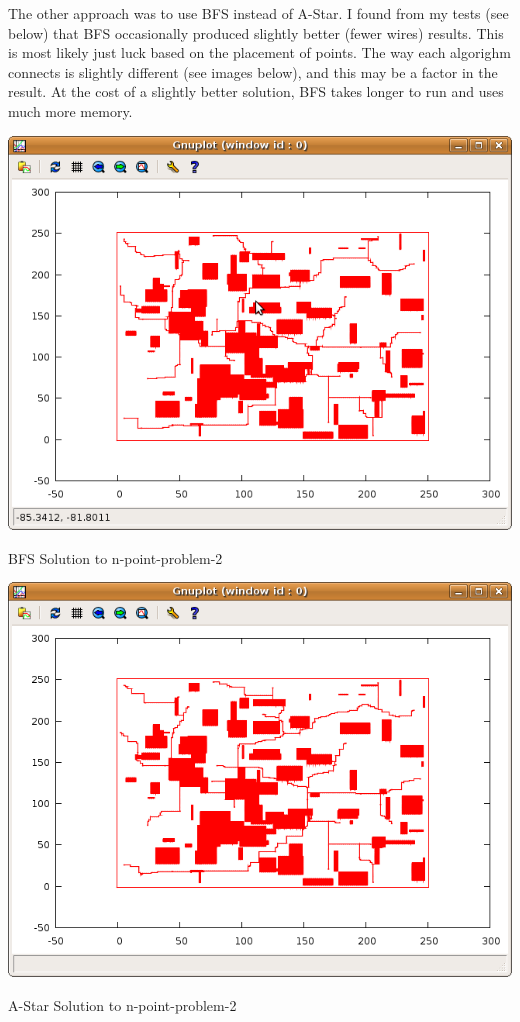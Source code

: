 \documentclass[12pt]{article}
\begin{document}
The other approach was to use BFS instead of A-Star.  I found from my tests (see
below) that BFS occasionally produced slightly better (fewer wires) results.
This is most likely just luck based on the placement of points.  The way each
algorighm connects is slightly different (see images below), and this may be a factor in the
result.  At the cost of a slightly better solution, BFS takes longer to run and
uses much more memory.\\

\begin{center}
\includegraphics[scale=0.5]{bfs.png}

BFS Solution to n-point-problem-2

\includegraphics[scale=0.5]{astar.png}

A-Star Solution to n-point-problem-2
\end{center}
\end{document}
